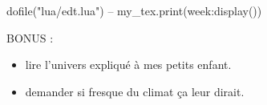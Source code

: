 \documentclass[10pt]{article}
\begin{document}
\thispagestyle{empty}

\setlength{\arrayrulewidth}{0.7mm}
\renewcommand{\arraystretch}{1.25}


\begin{luacode*}
    dofile("lua/edt.lua")
	-- my_tex.print(week:display())
\end{luacode*}

{\Large BONUS : \begin{itemize}
	\item lire l'univers expliqué à mes petits enfant.
	\item demander si fresque du climat ça leur dirait.
\end{itemize}}
\end{document}
